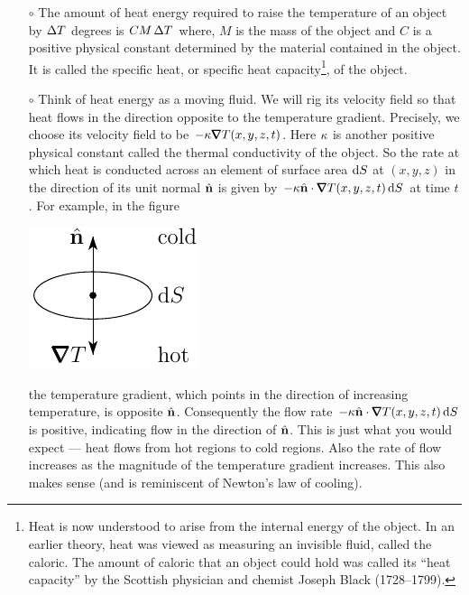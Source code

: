 \begin{itemize}\itemsep1pt \parskip0pt  %
\item[$\circ$] 
The amount of heat energy required to raise the temperature
of an object by $\Delta T$ degrees is $CM\,\Delta T$ where, $M$ is the mass 
of the object and $C$ is a positive physical constant determined by the 
material contained in the object. It is called the specific heat, or specific heat capacity\footnote{
Heat is now understood to arise from the internal energy of the object.
In an earlier theory, heat was viewed as measuring an invisible fluid, 
called the caloric. The amount of caloric that an object could hold 
was called its ``heat capacity'' by the Scottish physician and chemist 
Joseph Black (1728--1799).}, of the object.
\item[$\circ$]
Think of heat energy as a moving fluid. We will rig its velocity field so
that heat flows in the direction opposite to the temperature gradient.
Precisely, we choose its velocity field to be $-\ka\vnabla T(x,y,z,t)$. 
Here $\kappa$ is another positive physical constant called the thermal 
conductivity of the object. So the rate at which heat is conducted
across an element of surface area $\mathrm{d}S$ at $(x,y,z)$ in the direction of 
its unit normal $\hat{\mathbf{n}}$ is given by $-\ka\hn\cdot\vnabla T(x,y,z,t)\,\dee{S}$ at 
time $t$. For example, in the figure
\begin{nfig}
\begin{center}
    \includegraphics{heat1.pdf}
\end{center}
\end{nfig}
the temperature gradient, which points in the direction of 
increasing temperature, is opposite $\hat{\mathbf{n}}$. Consequently the flow rate 
$-\ka\hn\cdot\vnabla T(x,y,z,t)\,\dee{S}$ is positive, indicating flow in the 
direction of $\hat{\mathbf{n}}$. This is just what you would expect --- heat flows from
hot regions to cold regions. Also the rate of flow increases as the 
magnitude of the temperature gradient increases. This also makes sense
(and is reminiscent of Newton's law of cooling).
\end{itemize}
